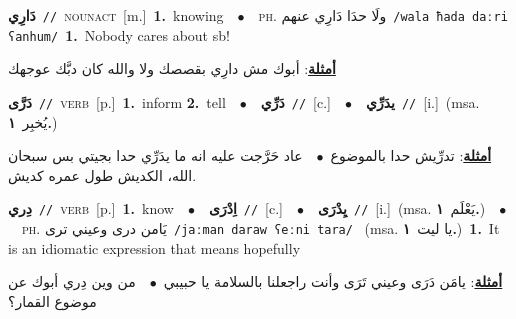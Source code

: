 \documentclass[10pt,a4paper,twoside]{article} %
\begin{document}
\begin{multicols}{2}
{\setlength\topsep{0pt}\textbf{\foreignlanguage{arabic}{دَارِي}}\ {\color{gray}\texttt{//}\color{black}}\ \textsc{noun\textunderscore act}\ [m.]\ \textbf{1.}~knowing\ \ $\bullet$\ \ \textsc{ph.} \color{gray} \foreignlanguage{arabic}{ولَا حدَا دَارِي عنهم}\color{black}\ {\color{gray}\texttt{/{\sffamily wala ħada daːri ʕanhum}/}\color{black}}\ \textbf{1.}~Nobody cares about sb!\  \begin{flushright}\color{gray}\foreignlanguage{arabic}{\textbf{\underline{\foreignlanguage{arabic}{أمثلة}}}: أبوك مش دارِي بقصصك ولا والله كان دبَّك عوجهك}\end{flushright}\color{black}} \vspace{2mm}

{\setlength\topsep{0pt}\textbf{\foreignlanguage{arabic}{دَرَّى}}\ {\color{gray}\texttt{//}\color{black}}\ \textsc{verb}\ [p.]\ \textbf{1.}~inform  \textbf{2.}~tell\ \ $\bullet$\ \ \setlength\topsep{0pt}\textbf{\foreignlanguage{arabic}{دَرِّي}}\ {\color{gray}\texttt{//}\color{black}}\ [c.]\ \ $\bullet$\ \ \setlength\topsep{0pt}\textbf{\foreignlanguage{arabic}{يدَرِّي}}\ {\color{gray}\texttt{//}\color{black}}\ [i.]\ \color{gray}(msa. \foreignlanguage{arabic}{يُخبِر}~\foreignlanguage{arabic}{\textbf{١.}})\color{black}\  \begin{flushright}\color{gray}\foreignlanguage{arabic}{\textbf{\underline{\foreignlanguage{arabic}{أمثلة}}}: تدرِّيش حدا بالموضوع\ $\bullet$\ \  عاد حَرَّجت عليه انه ما يدَرِّي حدا بجيتي بس سبحان الله، الكديش طول عمره كديش.}\end{flushright}\color{black}} \vspace{2mm}

{\setlength\topsep{0pt}\textbf{\foreignlanguage{arabic}{دِري}}\ {\color{gray}\texttt{//}\color{black}}\ \textsc{verb}\ [p.]\ \textbf{1.}~know\ \ $\bullet$\ \ \setlength\topsep{0pt}\textbf{\foreignlanguage{arabic}{اِدْرَى}}\ {\color{gray}\texttt{//}\color{black}}\ [c.]\ \ $\bullet$\ \ \setlength\topsep{0pt}\textbf{\foreignlanguage{arabic}{يِدْرَى}}\ {\color{gray}\texttt{//}\color{black}}\ [i.]\ \color{gray}(msa. \foreignlanguage{arabic}{يَعْلَم}~\foreignlanguage{arabic}{\textbf{١.}})\color{black}\ \ $\bullet$\ \ \textsc{ph.} \color{gray} \foreignlanguage{arabic}{يَامن درى وعيني ترى}\color{black}\ {\color{gray}\texttt{/{\sffamily jaːman daraw ʕeːni tara}/}\color{black}}\ \color{gray} (msa. \foreignlanguage{arabic}{يا ليت}~\foreignlanguage{arabic}{\textbf{١.}})\color{black}\ \textbf{1.}~It is an idiomatic expression that means hopefully\  \begin{flushright}\color{gray}\foreignlanguage{arabic}{\textbf{\underline{\foreignlanguage{arabic}{أمثلة}}}: يامَن دَرَى وعيني تَرَى وأنت راجعلنا بالسلامة يا حبيبي\ $\bullet$\ \  من وين دِري أبوك عن موضوع القمار؟}\end{flushright}\color{black}} \vspace{2mm}


\end{multicols}
\end{document}
